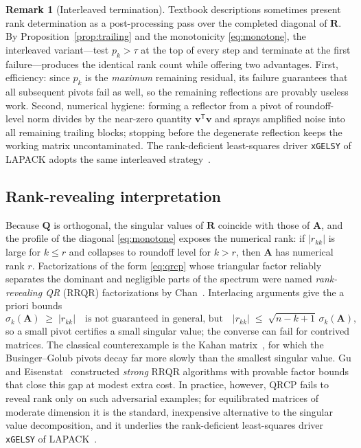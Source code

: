 \documentclass[11pt,a4paper]{article}
\theoremstyle{definition}
\newtheorem{remark}[theorem]{Remark}
\begin{document}
\begin{remark}[Interleaved termination]
\label{rem:interleaved}
Textbook descriptions sometimes present rank determination as a
post-processing pass over the completed diagonal of $\bm R$. By
Proposition~\ref{prop:trailing} and the monotonicity
\eqref{eq:monotone}, the interleaved variant---test $p_k>\tau$ at
the top of every step and terminate at the first failure---produces
the identical rank count while offering two advantages. First,
efficiency: since $p_k$ is the \emph{maximum} remaining residual, its
failure guarantees that all subsequent pivots fail as well, so the
remaining reflections are provably useless work. Second, numerical
hygiene: forming a reflector from a pivot of roundoff-level norm
divides by the near-zero quantity $\bm v^{\mathsf T}\bm v$ and
sprays amplified noise into all remaining trailing blocks; stopping
before the degenerate reflection keeps the working matrix
uncontaminated. The rank-deficient least-squares driver
\texttt{xGELSY} of LAPACK adopts the same interleaved
strategy~\cite{lapack1999}.
\end{remark}

\subsection{Rank-revealing interpretation}

Because $\bm Q$ is orthogonal, the singular values of $\bm R$ coincide
with those of $\bm A$, and the profile of the diagonal
\eqref{eq:monotone} exposes the numerical rank: if
$|r_{kk}|$ is large for $k\le r$ and collapses to roundoff level for
$k>r$, then $\bm A$ has numerical rank $r$. Factorizations of the
form \eqref{eq:qrcp} whose triangular factor reliably separates the
dominant and negligible parts of the spectrum were named
\emph{rank-revealing QR} (RRQR) factorizations by
Chan~\cite{chan1987}. Interlacing arguments give the a priori bounds
\begin{equation}
  \sigma_{k}(\bm A)\;\ge\;|r_{kk}|
  \quad\text{is not guaranteed in general, but}\quad
  |r_{kk}|\;\le\;\sqrt{n-k+1}\,\sigma_{k}(\bm A),
\end{equation}
so a small pivot certifies a small singular value; the converse can
fail for contrived matrices. The classical counterexample is the
Kahan matrix~\cite{kahan1966}, for which the Businger--Golub pivots
decay far more slowly than the smallest singular value. Gu and
Eisenstat~\cite{gueisenstat1996} constructed \emph{strong} RRQR
algorithms with provable factor bounds that close this gap at modest
extra cost. In practice, however, QRCP fails to reveal rank only on
such adversarial examples; for equilibrated matrices of moderate
dimension it is the standard, inexpensive alternative to the singular
value decomposition, and it underlies the rank-deficient least-squares
driver \texttt{xGELSY} of LAPACK~\cite{lapack1999}.
\end{document}
